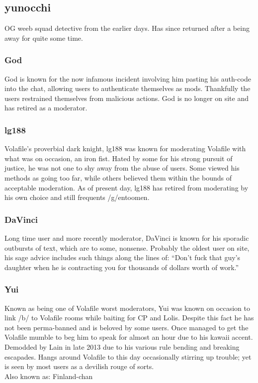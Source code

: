 \documentclass[12pt]{report}
\begin{document}
{{        \subsection {yunocchi}
        OG weeb squad detective from the earlier days.
        Has since returned after a being away for quite some time.

        \subsubsection{God}
        God is known for the now infamous incident involving him pasting
        his auth-code into the chat, allowing users to authenticate
        themselves as mods. Thankfully the users restrained themselves
        from malicious actions. God is no longer on site and has
        retired as a moderator.

        \subsubsection{lg188}
        Volafile's proverbial dark knight, lg188 was known for moderating
        Volafile with what was on occasion, an iron fist. Hated by some
        for his strong pursuit of justice, he was not one to shy away
        from the abuse of users. Some viewed his methods as going too far,
        while others believed them within the bounds of acceptable moderation.
        As of present day, lg188 has retired from moderating by his own
        choice and still frequents /g/entoomen.

        \subsubsection{DaVinci}
        Long time user and more recently moderator, DaVinci is known for his
        sporadic outbursts of text, which are to some, nonsense.
        Probably the oldest user on site, his sage advice includes such
        things along the lines of: ``Don't fuck that guy's daughter when
        he is contracting you for thousands of dollars worth of work.''

        \vfill
        \pagebreak

        \subsubsection{Yui}
        Known as being one of Volafile worst moderators, Yui was known on
        occasion to link /b/ to Volafile rooms while baiting for CP and Lolis.
        Despite this fact he has not been perma-banned and is beloved by
        some users. Once managed to get the Volafile mumble to beg him
        to speak for almost an hour due to his kawaii accent. Demodded by
        Lain in late 2013 due to his various rule bending and breaking escapades.
        Hangs around Volafile to this day occasionally stirring up trouble;
        yet is seen by most users as a devilish rouge of sorts.\\
	Also known as: Finland-chan

}}
\end{document}
